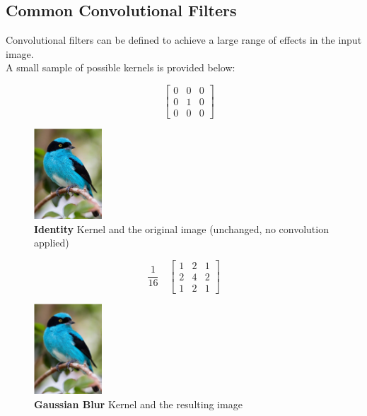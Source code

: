 \subsection{Common Convolutional Filters}
\label{sec:convolution:convolutionalfilters:commonconvolutionalfilters}
Convolutional filters can be defined to achieve a large range of effects in the input image.\\
A small sample of possible kernels is provided below:
\begin{figure}[h]
\begin{minipage}[b]{0.5\linewidth}
\centering
    $$
    \quad
    \begin{bmatrix} 
    0 & 0 & 0 \\
    0 & 1 & 0 \\
    0 & 0 & 0
    \end{bmatrix}
    $$
\caption{\textbf{Identity} Kernel and the original image (unchanged, no convolution applied)}
\end{minipage}
\begin{minipage}[b]{0.3\linewidth}
\centering
\includegraphics[width=1in]{graphics/convolution/Convolution_gebs_KernelIdentity.png}
\end{minipage}
\label{fig:Identity Kernel}
\end{figure}
\FloatBarrier
\begin{figure}[h]
\begin{minipage}[b]{0.5\linewidth}
\centering
    $$
    \frac{1}{16}
    \quad
    \begin{bmatrix} 
    1 & 2 & 1 \\
    2 & 4 & 2 \\
    1 & 2 & 1
    \end{bmatrix}
    $$
\caption{\textbf{Gaussian Blur} Kernel and the resulting image}
\end{minipage}
\begin{minipage}[b]{0.3\linewidth}
\centering
\includegraphics[width=1in]{graphics/convolution/Convolution_gebs_KernelGaussianBlur3x3.png}
\end{minipage}
\label{fig:Gaussian Blur Kernel}
\end{figure}
